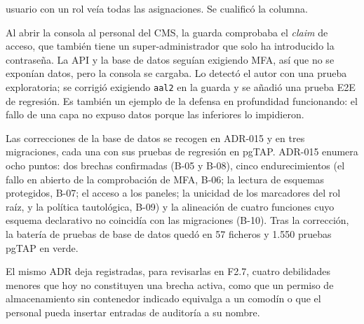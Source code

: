 \begin{description}
        usuario con un rol veía todas las asignaciones. Se cualificó la
        columna.
  \item[B-14 · Consola sin segundo factor.] Al abrir la consola al personal
        del CMS, la guarda comprobaba el \textit{claim} de acceso, que
        también tiene un super-administrador que solo ha introducido la
        contraseña. La API y la base de datos seguían exigiendo MFA, así que
        no se exponían datos, pero la consola se cargaba. Lo detectó el autor
        con una prueba exploratoria; se corrigió exigiendo \texttt{aal2} en
        la guarda y se añadió una prueba E2E de regresión. Es también un
        ejemplo de la defensa en profundidad funcionando: el fallo de una
        capa no expuso datos porque las inferiores lo impidieron.
\end{description}

Las correcciones de la base de datos se recogen en ADR-015 y en tres
migraciones, cada una con sus pruebas de regresión en pgTAP. ADR-015 enumera
ocho puntos: dos brechas confirmadas (B-05 y B-08), cinco endurecimientos
(el fallo en abierto de la comprobación de MFA, B-06; la lectura de esquemas
protegidos, B-07; el acceso a los paneles; la unicidad de los marcadores del
rol raíz, y la política tautológica, B-09) y la alineación de cuatro funciones
cuyo esquema declarativo no coincidía con las migraciones (B-10).
Tras la corrección, la batería de pruebas de base de datos quedó en 57
ficheros y 1.550 pruebas pgTAP en verde.

El mismo ADR deja registradas, para revisarlas en F2.7, cuatro debilidades
menores que hoy no constituyen una brecha activa, como que un permiso de
almacenamiento sin contenedor indicado equivalga a un comodín o que el
personal pueda insertar entradas de auditoría a su nombre.

